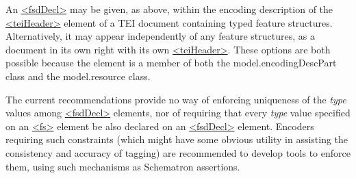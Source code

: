 An \hyperref[TEI.fsdDecl]{<fsdDecl>} may be given, as above, within the encoding description of the \hyperref[TEI.teiHeader]{<teiHeader>} element of a TEI document containing typed feature structures. Alternatively, it may appear independently of any feature structures, as a document in its own right with its own \hyperref[TEI.teiHeader]{<teiHeader>}. These options are both possible because the element is a member of both the \textsf{model.encodingDescPart} class and the \textsf{model.resource} class.\par
The current recommendations provide no way of enforcing uniqueness of the {\itshape type} values among \hyperref[TEI.fsdDecl]{<fsdDecl>} elements, nor of requiring that every {\itshape type} value specified on an \hyperref[TEI.fs]{<fs>} element be also declared on an \hyperref[TEI.fsdDecl]{<fsdDecl>} element. Encoders requiring such constraints (which might have some obvious utility in assisting the consistency and accuracy of tagging) are recommended to develop tools to enforce them, using such mechanisms as Schematron assertions.
